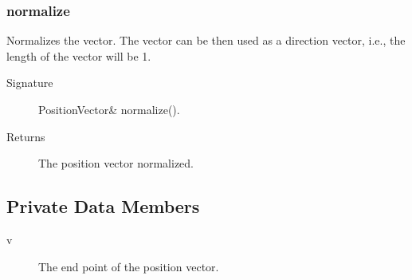 \subsubsection{normalize}
Normalizes the vector. The vector can be then used as a direction
vector, i.e., the length of the vector will be 1.
  \begin{description}
     \item [Signature] PositionVector\& normalize().
     \item [Returns] The position vector normalized.
  \end{description} 

\subsection{Private Data Members}
\begin{description}
   \item [v] The end point of the position vector.
\end{description} 



